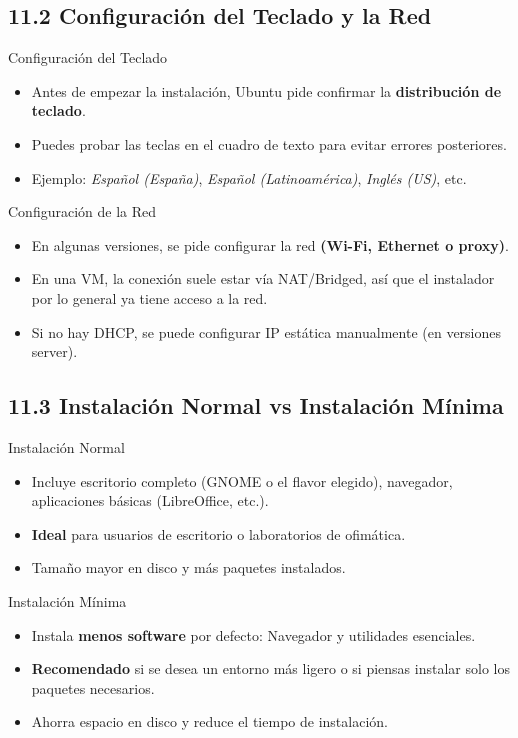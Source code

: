 \documentclass{beamer}
\begin{document}
\subsection{11.2 Configuración del Teclado y la Red}
\begin{frame}{Configuración del Teclado}
	\begin{itemize}
		\item Antes de empezar la instalación, Ubuntu pide confirmar la \textbf{distribución de teclado}.
		\item Puedes probar las teclas en el cuadro de texto para evitar errores posteriores.
		\item Ejemplo: \textit{Español (España)}, \textit{Español (Latinoamérica)}, \textit{Inglés (US)}, etc.
	\end{itemize}
\end{frame}

\begin{frame}{Configuración de la Red}
	\begin{itemize}
		\item En algunas versiones, se pide configurar la red \textbf{(Wi-Fi, Ethernet o proxy)}.
		\item En una VM, la conexión suele estar vía NAT/Bridged, así que el instalador por lo general ya tiene acceso a la red.
		\item Si no hay DHCP, se puede configurar IP estática manualmente (en versiones server).
	\end{itemize}
\end{frame}

\subsection{11.3 Instalación Normal vs Instalación Mínima}
\begin{frame}{Instalación Normal}
	\begin{itemize}
		\item Incluye escritorio completo (GNOME o el flavor elegido), navegador, aplicaciones básicas (LibreOffice, etc.).
		\item \textbf{Ideal} para usuarios de escritorio o laboratorios de ofimática.
		\item Tamaño mayor en disco y más paquetes instalados.
	\end{itemize}
\end{frame}

\begin{frame}{Instalación Mínima}
	\begin{itemize}
		\item Instala \textbf{menos software} por defecto: Navegador y utilidades esenciales.
		\item \textbf{Recomendado} si se desea un entorno más ligero o si piensas instalar solo los paquetes necesarios.
		\item Ahorra espacio en disco y reduce el tiempo de instalación.
	\end{itemize}
\end{frame}
\end{document}
